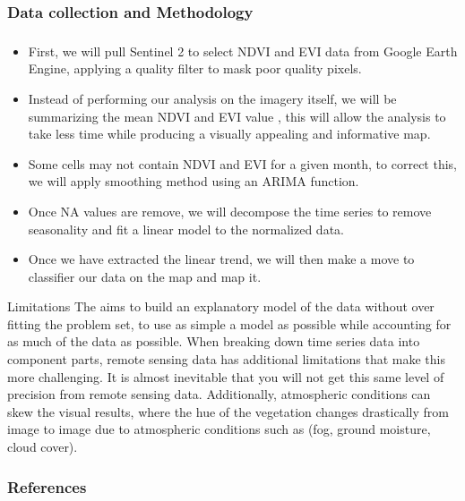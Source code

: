 \documentclass[11pt]{beamer}
\begin{document}
    \begin{frame}
    	\frametitle{Data collection and Methodology}
    \end{frame}
     \begin{frame}
     	\frametitle{}
     	\begin{itemize}
     \item	First, we will pull Sentinel 2 to select NDVI and EVI data from Google Earth Engine, applying a quality filter to mask poor quality pixels.\\	
     \item	Instead of performing our analysis on the imagery itself, we will be summarizing the mean NDVI and EVI value , this will allow the analysis to take less time while producing a visually appealing and informative map.\\	
     \item	Some cells may not contain NDVI and EVI for a given month, to correct this, we will apply  smoothing method using an ARIMA function.\\	
    \item 	Once NA values are remove, we will decompose the time series to remove seasonality and fit a linear model to the normalized data.\\	
    \item 	Once we have extracted the linear trend, we will then make a move to classifier our data on the map and map it.
     \end{itemize}
     \end{frame}
 \begin{frame}
 \begin{block}{Limitations}
  The aims to build an explanatory model of the data without over fitting the problem set, to use as simple a model as possible while accounting for as much of the data as possible. When breaking down time series data into component parts, remote sensing data has additional limitations that make this more challenging. It is almost inevitable that you will not get this same level of precision from remote sensing data. Additionally, atmospheric conditions can skew the visual results, where the hue of the vegetation changes drastically from image to image due to atmospheric conditions such as (fog, ground moisture, cloud cover).
 \end{block}
\end{frame}
\begin{frame}
	\frametitle{References}
	\printbibliography[]
\end{frame}
\end{document}
